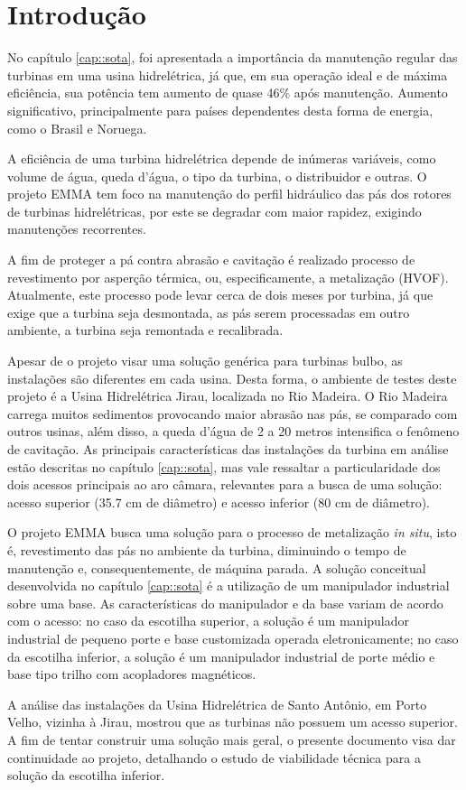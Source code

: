 \section{Introdução}\label{sec::introducao}

No capítulo \ref{cap::sota}, foi apresentada a importância da manutenção regular
das turbinas em uma usina hidrelétrica, já que, em sua operação ideal e de máxima eficiência,
sua potência tem aumento de quase 46\% após manutenção. Aumento significativo,
principalmente para países dependentes desta forma de energia, como o Brasil e
Noruega.

A eficiência de uma turbina hidrelétrica depende de inúmeras variáveis, como
volume de água, queda d'água, o tipo da turbina, o distribuidor e outras. O
projeto EMMA tem foco na manutenção do perfil hidráulico das pás dos rotores de
turbinas hidrelétricas, por este se degradar com maior rapidez, exigindo
manutenções recorrentes. 

A fim de proteger a pá contra abrasão e cavitação é realizado processo de
revestimento por asperção térmica, ou, especificamente, a metalização (HVOF).
Atualmente, este processo pode levar cerca de dois meses por turbina,
já que exige que a turbina seja desmontada, as pás serem processadas em
outro ambiente, a turbina seja remontada e recalibrada.

Apesar de o projeto visar uma solução genérica para turbinas bulbo, as
instalações são diferentes em cada usina. Desta forma, o ambiente de testes
deste projeto é a Usina Hidrelétrica Jirau, localizada no Rio Madeira. O Rio
Madeira carrega muitos sedimentos provocando maior abrasão nas pás, se comparado
com outros usinas, além disso, a queda d'água de 2 a 20 metros intensifica o
fenômeno de cavitação. As principais características das instalações da turbina
em análise estão descritas no capítulo \ref{cap::sota}, mas vale ressaltar a
particularidade dos dois acessos principais ao aro câmara, relevantes para a busca de uma
solução: acesso superior (35.7 cm de diâmetro) e acesso inferior (80 cm de
diâmetro).

O projeto EMMA busca uma solução para o processo de metalização \textit{in
situ}, isto é, revestimento das pás no ambiente da turbina, diminuindo o tempo
de manutenção e, consequentemente, de máquina parada.  A solução conceitual
desenvolvida no capítulo \ref{cap::sota} é a utilização de um manipulador
industrial sobre uma base. As características do manipulador e da base variam de acordo com o
acesso: no caso da escotilha superior, a solução é um manipulador industrial de
pequeno porte e base customizada operada eletronicamente; no caso da escotilha
inferior, a solução é um manipulador industrial de porte médio e base tipo
trilho com acopladores magnéticos.

A análise das instalações da Usina Hidrelétrica de Santo Antônio, em Porto
Velho, vizinha à Jirau, mostrou que as turbinas não possuem um acesso superior.
A fim de tentar construir uma solução mais geral, o presente documento visa dar
continuidade ao projeto, detalhando o estudo de viabilidade técnica para a
solução da escotilha inferior.

